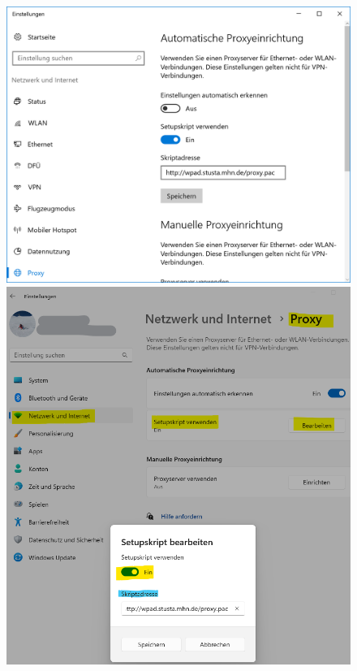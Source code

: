 \documentclass[a4paper,12pt]{scrartcl}
\begin{document}
\begin{figure}[h]
	\centering
	\begin{minipage}{.55\textwidth}
		\centering
		\includegraphics[height=.20\textheight]{Bilder/Proxy_Edge}
	\end{minipage}
	\begin{minipage}{.30\textwidth}
		\centering
		\includegraphics[height=.20\textheight]{Bilder/Win11/proxy_win11_de}
	\end{minipage}
\end{figure}
\end{document}
